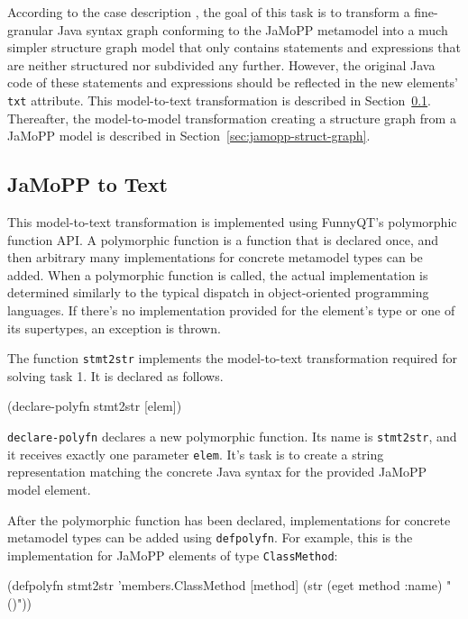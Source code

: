 \documentclass[11pt]{article}
\begin{document}
According to the case description \cite{flowgraphcasedesc}, the goal of this
task is to transform a fine-granular Java syntax graph conforming to the JaMoPP
metamodel \cite{jamopp09} into a much simpler structure graph model that only
contains statements and expressions that are neither structured nor subdivided
any further.  However, the original Java code of these statements and
expressions should be reflected in the new elements' \verb|txt| attribute.
This model-to-text transformation is described in
Section~\ref{sec:jamopp-text}.  Thereafter, the model-to-model transformation
creating a structure graph from a JaMoPP model is described in
Section~\ref{sec:jamopp-struct-graph}.


\subsection{JaMoPP to Text}
\label{sec:jamopp-text}

This model-to-text transformation is implemented using FunnyQT's polymorphic
function API.  A polymorphic function is a function that is declared once, and
then arbitrary many implementations for concrete metamodel types can be added.
When a polymorphic function is called, the actual implementation is determined
similarly to the typical dispatch in object-oriented programming languages.  If
there's no implementation provided for the element's type or one of its
supertypes, an exception is thrown.

The function \verb|stmt2str| implements the model-to-text transformation
required for solving task 1.  It is declared as follows.

\begin{clojurecode}
(declare-polyfn stmt2str [elem])
\end{clojurecode}

\verb|declare-polyfn| declares a new polymorphic function.  Its name is
\verb|stmt2str|, and it receives exactly one parameter \verb|elem|.  It's task
is to create a string representation matching the concrete Java syntax for the
provided JaMoPP model element.

After the polymorphic function has been declared, implementations for concrete
metamodel types can be added using \verb|defpolyfn|.  For example, this is the
implementation for JaMoPP elements of type \verb|ClassMethod|:

\begin{clojurecode}
(defpolyfn stmt2str 'members.ClassMethod
  [method]
  (str (eget method :name) "()"))
\end{clojurecode}
\end{document}
